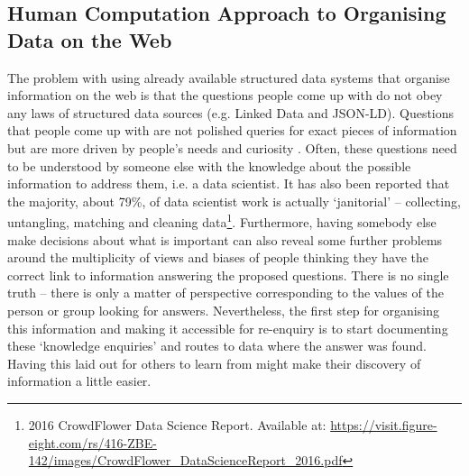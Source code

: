 \subsection{Human Computation Approach to Organising Data on the Web}
The problem with using already available structured data systems that organise information on the web is that the questions people come up with do not obey any laws of structured data sources (e.g. Linked Data and JSON-LD). Questions that people come up with are not polished queries for exact pieces of information but are more driven by people's needs and curiosity \citep{paritosh_what_2018}. Often, these questions need to be understood by someone else with the knowledge about the possible information to address them, i.e. a data scientist. It has also been reported that the majority, about 79\%, of data scientist work is actually `janitorial' -- collecting, untangling, matching and cleaning data\footnote{2016 CrowdFlower Data Science Report. Available at: \url{https://visit.figure-eight.com/rs/416-ZBE-142/images/CrowdFlower_DataScienceReport_2016.pdf}}. Furthermore, having somebody else make decisions about what is important can also reveal some further problems around the multiplicity of views and biases of people thinking they have the correct link to information answering the proposed questions. There is no single truth -- there is only a matter of perspective corresponding to the values of the person or group looking for answers. Nevertheless, the first step for organising this information and making it accessible for re-enquiry is to start documenting these `knowledge enquiries' and routes to data where the answer was found. Having this laid out for others to learn from might make their discovery of information a little easier.

